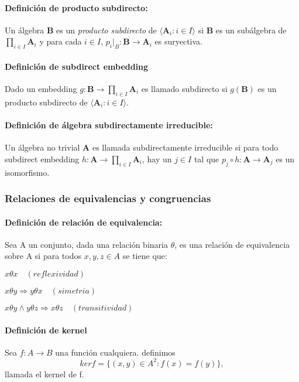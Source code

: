 \documentclass{article}
\begin{document}
\paragraph{Definición de producto subdirecto:} 
Un álgebra \textbf{B} es un \textit{producto subdirecto} de $\langle \textbf{A}_i \colon i \in I \rangle$ si \textbf{B} es un subálgebra de $\prod_{i \in I} \textbf{A}_i$ y para cada $i \in I$, $\textit{p}_i|_B \colon \textbf{B} \to \textbf{A}_i$ es suryectiva.
\paragraph{Definición de subdirect embedding}
Dado un embedding $ g \colon \textbf{B} \to \prod_{i \in I} \textbf{A}_i$ es llamado subdirecto si $g(\textbf{B})$ es un producto subdirecto de $\langle \textbf{A}_i \colon i \in I \rangle$.
\paragraph{Definición de álgebra subdirectamente irreducible:}
Un álgebra no trivial \textbf{A} es llamada subdirectamente irreducible si para todo subdirect embedding $h \colon \textbf{A} \to \prod_{i \in I}\textbf{A}_i$, hay un $j \in I$ tal que $p_j \circ h \colon \textbf{A} \to \textbf{A}_j$ es un isomorfismo.

\subsubsection{Relaciones de equivalencias y congruencias}
\paragraph{Definición de relación de equivalencia:}
Sea A un conjunto, dada una relación binaria $\theta$, es una relación de equivalencia sobre A si para todos $x, y,z \in A$ se tiene que:

$x \theta x \quad (reflexividad)$

$x \theta y \Rightarrow y \theta x \quad (simetria)$

$x \theta y \land y \theta z \Rightarrow x \theta z \quad (transitividad)$
\paragraph{Definición de kernel}
Sea $f \colon A \to B$ una función cualquiera. definimos 
\[ ker f = \{ (x,y) \in A^2 \colon f(x) = f(y)\},\]
llamada el kernel de f.
\end{document}
